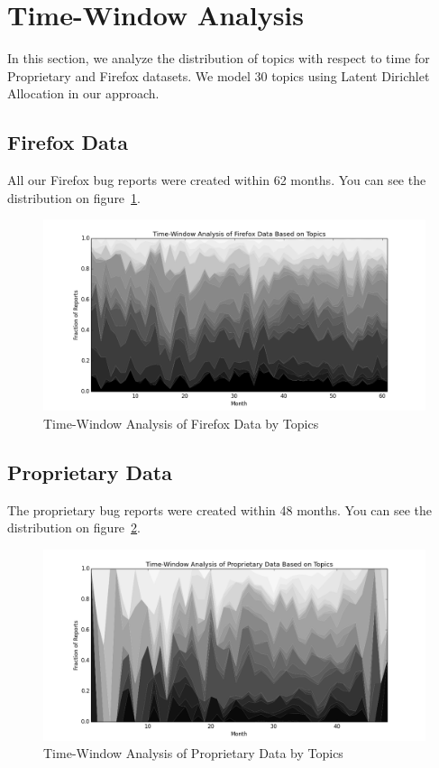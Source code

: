 \section{Time-Window Analysis}

In this section, we analyze the distribution of topics with respect to time for Proprietary and Firefox datasets. We model 30 topics using Latent Dirichlet Allocation in our approach.

\subsection{Firefox Data}

All our Firefox bug reports were created within 62 months. You can see the distribution on figure~\ref{fig:distribution.firefox.topic}.

\begin{figure}[htbp]
    \centering
        \includegraphics[width=\textwidth]{./images/topic_component_distribution/firefox_topic.png}
    \caption{Time-Window Analysis of Firefox Data by Topics}
    \label{fig:distribution.firefox.topic}
\end{figure}

\subsection{Proprietary Data}

The proprietary bug reports were created within 48 months. You can see the distribution on figure~\ref{fig:distribution.prop.topic}.

\begin{figure}[htbp]
    \centering
        \includegraphics[width=\textwidth]{./images/topic_component_distribution/proprietary_topic.png}
    \caption{Time-Window Analysis of Proprietary Data by Topics}
    \label{fig:distribution.prop.topic}
\end{figure}

